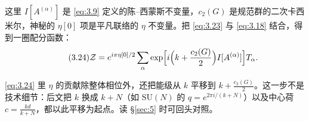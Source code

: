 这里 $I[A^{(\alpha)}]$ 是 \eqref{eq:3.9} 定义的陈--西蒙斯不变量，$c_2(G)$ 是规范群的二次卡西米尔，神秘的 $\eta[0]$ 项是平凡联络的 $\eta$ 不变量。把 \eqref{eq:3.23} 与 \eqref{eq:3.18} 结合，得到一圈配分函数：
\begin{equation}\tag{3.24}\label{eq:3.24}
  \mathcal{Z} = e^{i\pi\eta[0]/2}\sum_\alpha\exp\Bigl[i\Bigl(k + \frac{c_2(G)}{2}\Bigr)I[A^{(\alpha)}]\Bigr]T_\alpha.
\end{equation}

\begin{yizhu}[物理图像]
\eqref{eq:3.24} 里 $\eta$ 的贡献除整体相位外，还把能级从 $k$ 平移到 $k+\frac{c_2(G)}{2}$。这一步不是技术细节：后文把 $k$ 换成 $k+N$（如 $\mathrm{SU}(N)$ 的 $q=e^{2\pi i/(k+N)}$）以及中心荷 $c=\frac{kd}{k+N}$，都以此平移为起点。读 \S\ref{sec:5} 时可回头对照。
\end{yizhu}

